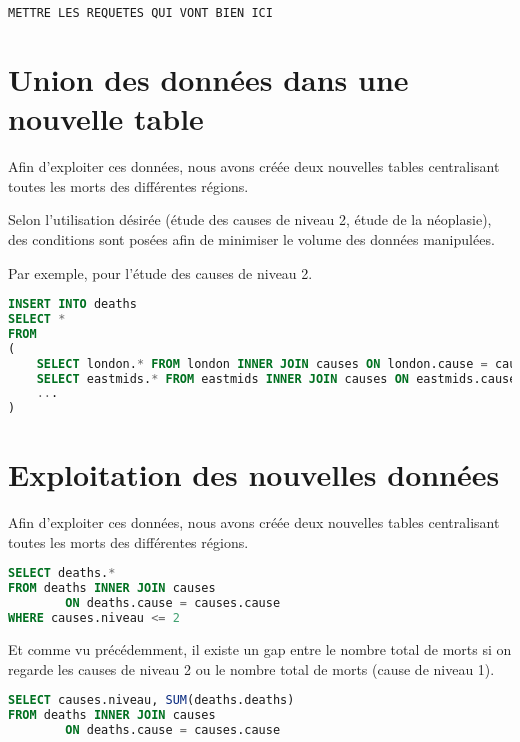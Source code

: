     \begin{lstlisting}[frame=single, language=SQL]
METTRE LES REQUETES QUI VONT BIEN ICI
    \end{lstlisting}

\section{Union des données dans une nouvelle table}

    Afin d'exploiter ces données, nous avons créée deux nouvelles tables centralisant toutes les morts des différentes régions.

    Selon l'utilisation désirée (étude des causes de niveau 2, étude de la néoplasie), des conditions sont posées afin
    de minimiser le volume des données manipulées.

    Par exemple, pour l'étude des causes de niveau 2.

    \begin{lstlisting}[frame=single, language=SQL]
INSERT INTO deaths
SELECT *
FROM
(
    SELECT london.* FROM london INNER JOIN causes ON london.cause = causes.cause WHERE causes.niveau <= 2 UNION
    SELECT eastmids.* FROM eastmids INNER JOIN causes ON eastmids.cause = causes.cause WHERE causes.niveau <= 2 UNION
    ...
)
    \end{lstlisting}


\section{Exploitation des nouvelles données}

    Afin d'exploiter ces données, nous avons créée deux nouvelles tables centralisant toutes les morts des différentes régions.

    \begin{lstlisting}[frame=single, language=SQL]
SELECT deaths.*
FROM deaths INNER JOIN causes
        ON deaths.cause = causes.cause
WHERE causes.niveau <= 2
    \end{lstlisting}

    Et comme vu précédemment, il existe un gap entre le nombre total de morts si on regarde les causes de niveau 2 ou le nombre
    total de morts (cause de niveau 1).

    \begin{lstlisting}[frame=single, language=SQL]
SELECT causes.niveau, SUM(deaths.deaths)
FROM deaths INNER JOIN causes
        ON deaths.cause = causes.cause
    \end{lstlisting}

